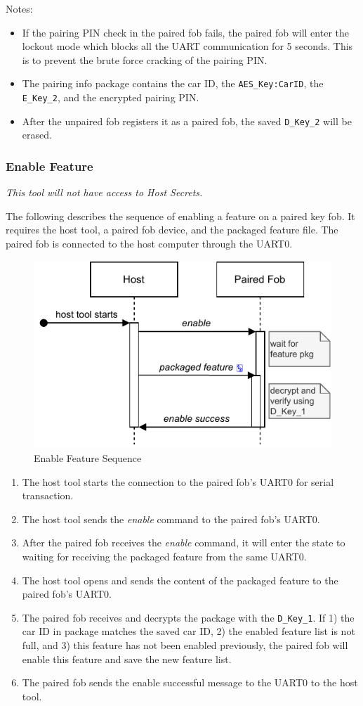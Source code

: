 \documentclass[11pt,oneside,onecolumn,letterpaper]{article}
\begin{document}
Notes:
\begin{itemize}
	\item If the pairing PIN check in the paired fob fails, the paired fob will enter the lockout mode which blocks all the UART communication for 5 seconds. This is to prevent the brute force cracking of the pairing PIN.
	\item The pairing info package contains the car ID, the \verb|AES_Key:CarID|, the \verb|E_Key_2|, and the encrypted pairing PIN.
	\item After the unpaired fob registers it as a paired fob, the saved \verb|D_Key_2| will be erased.
\end{itemize}

\subsubsection{Enable Feature}

\textit{This tool will not have access to Host Secrets.}

The following describes the sequence of enabling a feature on a paired key fob. It requires the host tool, a paired fob device, and the packaged feature file. The paired fob is connected to the host computer through the UART0.

\begin{figure}[!htbp]
	\begin{centering}
		\includegraphics[width = .5\textwidth]{pic/enable.pdf}
		\caption{Enable Feature Sequence}
		\label{fig:enable}
	\end{centering}
\end{figure}

\begin{enumerate}
	\item The host tool starts the connection to the paired fob's UART0 for serial transaction.
	\item The host tool sends the \textit{enable} command to the paired fob's UART0.
	\item After the paired fob receives the \textit{enable} command, it will enter the state to waiting for receiving the packaged feature from the same UART0.
	\item The host tool opens and sends the content of the packaged feature to the paired fob's UART0.
	\item The paired fob receives and decrypts the package with the \verb|D_Key_1|. If 1) the car ID in package matches the saved car ID, 2) the enabled feature list is not full, and 3) this feature has not been enabled previously, the paired fob will enable this feature and save the new feature list.
	\item The paired fob sends the enable successful message to the UART0 to the host tool.
\end{enumerate}
\end{document}
